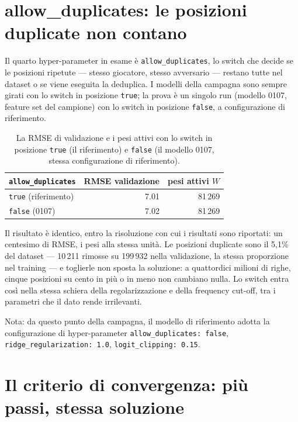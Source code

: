 \section{allow\_duplicates: le posizioni duplicate non contano}

Il quarto hyper-parameter in esame è \texttt{allow\_duplicates}, lo
switch che decide se le posizioni ripetute — stesso giocatore, stesso
avversario — restano tutte nel dataset o se viene eseguita la
deduplica. I modelli della campagna sono sempre girati con lo switch
in posizione \texttt{true}; la prova è un singolo run (modello 0107,
feature set del campione) con lo switch in posizione
\texttt{false}, a configurazione di riferimento.

\begin{table}[ht]
\centering
\begin{tabular}{lrr}
\toprule
\texttt{allow\_duplicates} & RMSE validazione & pesi attivi $W$ \\
\midrule
\texttt{true}  (riferimento) & 7.01 & 81\,269 \\
\texttt{false} (0107)       & 7.02 & 81\,269 \\
\bottomrule
\end{tabular}
\caption{La RMSE di validazione e i pesi attivi con lo switch in
posizione \texttt{true} (il riferimento) e \texttt{false} (il modello
0107, stessa configurazione di riferimento).}
\label{tab:allow-duplicates}
\end{table}

Il risultato è identico, entro la risoluzione con cui i risultati
sono riportati: un centesimo di RMSE, i pesi alla stessa
unità. Le posizioni duplicate sono il 5,1\% del dataset —
10\,211 rimosse su 199\,932 nella validazione, la stessa proporzione
nel training — e toglierle non sposta la soluzione: a quattordici
milioni di righe, cinque posizioni su cento in più o in meno non
cambiano nulla. Lo switch entra così nella stessa schiera della
regolarizzazione e della frequency cut-off, tra i parametri che il
dato rende irrilevanti.

Nota: da questo punto della campagna, il modello di riferimento
adotta la configurazione di hyper-parameter
\texttt{allow\_duplicates: false},
\texttt{ridge\_regularization: 1.0},
\texttt{logit\_clipping: 0.15}.

\section{Il criterio di convergenza: più passi, stessa soluzione}

